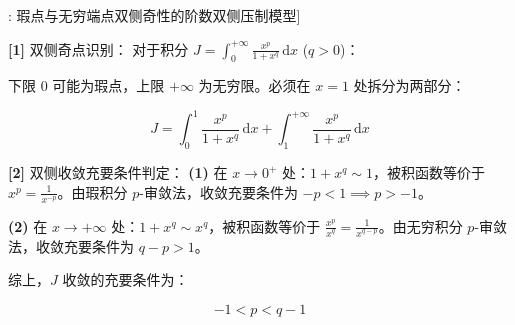 \documentclass[11pt,a4paper,UTF8]{ctexart}
\begin{document}
\begin{thmbox}[模型[2]: 瑕点与无穷端点双侧奇性的阶数双侧压制模型]

\textbf{[1]} 双侧奇点识别：
对于积分 $J = \int_0^{+\infty} \frac{x^p}{1+x^q}\,\mathrm{d}x$ ($q > 0$)：

下限 0 可能为瑕点，上限 $+\infty$ 为无穷限。必须在 $x=1$ 处拆分为两部分：


\begin{equation*}
J = \int_0^1 \frac{x^p}{1+x^q}\,\mathrm{d}x + \int_1^{+\infty} \frac{x^p}{1+x^q}\,\mathrm{d}x
\end{equation*}


\textbf{[2]} 双侧收敛充要条件判定：
\textbf{(1)}  在 $x \to 0^+$ 处：$1+x^q \sim 1$，被积函数等价于 $x^p = \frac{1}{x^{-p}}$。由瑕积分 $p$-审敛法，收敛充要条件为 $-p < 1 \implies p > -1$。

\textbf{(2)}  在 $x \to +\infty$ 处：$1+x^q \sim x^q$，被积函数等价于 $\frac{x^p}{x^q} = \frac{1}{x^{q-p}}$。由无穷积分 $p$-审敛法，收敛充要条件为 $q - p > 1$。

综上，$J$ 收敛的充要条件为：


\begin{equation*}
-1 < p < q - 1
\end{equation*}

\end{thmbox}
\end{document}

